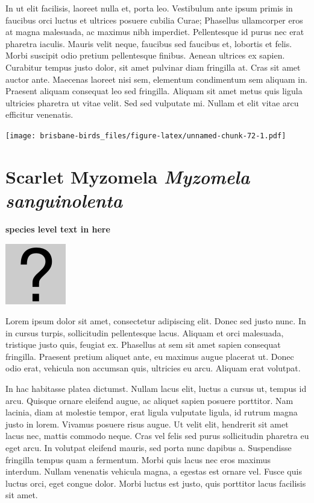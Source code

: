 \documentclass[]{book}
\let\origfigure\figure
\let\endorigfigure\endfigure
\renewenvironment{figure}[1][2] {
  \expandafter\origfigure\expandafter[H]
} {
  \endorigfigure
}
\begin{document}
In ut elit facilisis, laoreet nulla et, porta leo. Vestibulum ante ipsum
primis in faucibus orci luctus et ultrices posuere cubilia Curae;
Phasellus ullamcorper eros at magna malesuada, ac maximus nibh
imperdiet. Pellentesque id purus nec erat pharetra iaculis. Mauris velit
neque, faucibus sed faucibus et, lobortis et felis. Morbi suscipit odio
pretium pellentesque finibus. Aenean ultrices ex sapien. Curabitur
tempus justo dolor, sit amet pulvinar diam fringilla at. Cras sit amet
auctor ante. Maecenas laoreet nisi sem, elementum condimentum sem
aliquam in. Praesent aliquam consequat leo sed fringilla. Aliquam sit
amet metus quis ligula ultricies pharetra ut vitae velit. Sed sed
vulputate mi. Nullam et elit vitae arcu efficitur venenatis.

\begin{figure}
\centering
\texttt{[image: brisbane-birds\_files/figure-latex/unnamed-chunk-72-1.pdf]}
\caption{\label{fig:unnamed-chunk-72}insert figure caption}
\end{figure}

\section{\texorpdfstring{Scarlet Myzomela \emph{Myzomela
sanguinolenta}}{Scarlet Myzomela Myzomela sanguinolenta}}\label{scarlet-myzomela-myzomela-sanguinolenta}

\textbf{species level text in here}

\begin{figure}
\centering
\includegraphics{assets/missing.png}
\caption{No image for species}
\end{figure}

Lorem ipsum dolor sit amet, consectetur adipiscing elit. Donec sed justo
nunc. In in cursus turpis, sollicitudin pellentesque lacus. Aliquam et
orci malesuada, tristique justo quis, feugiat ex. Phasellus at sem sit
amet sapien consequat fringilla. Praesent pretium aliquet ante, eu
maximus augue placerat ut. Donec odio erat, vehicula non accumsan quis,
ultricies eu arcu. Aliquam erat volutpat.

In hac habitasse platea dictumst. Nullam lacus elit, luctus a cursus ut,
tempus id arcu. Quisque ornare eleifend augue, ac aliquet sapien posuere
porttitor. Nam lacinia, diam at molestie tempor, erat ligula vulputate
ligula, id rutrum magna justo in lorem. Vivamus posuere risus augue. Ut
velit elit, hendrerit sit amet lacus nec, mattis commodo neque. Cras vel
felis sed purus sollicitudin pharetra eu eget arcu. In volutpat eleifend
mauris, sed porta nunc dapibus a. Suspendisse fringilla tempus quam a
fermentum. Morbi quis lacus nec eros maximus interdum. Nullam venenatis
vehicula magna, a egestas est ornare vel. Fusce quis luctus orci, eget
congue dolor. Morbi luctus est justo, quis porttitor lacus facilisis sit
amet.
\end{document}
